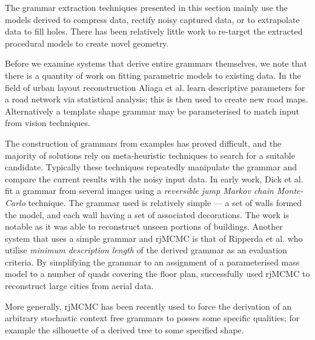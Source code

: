 



The grammar extraction techniques presented in this section mainly use the models derived to compress data, rectify noisy captured data, or to extrapolate data to fill holes. There has been relatively little work to re-target the extracted procedural models to create novel geometry.

Before we examine systems that derive entire grammars themselves, we note that there is a quantity of work on fitting parametric models to existing data. In the field of urban layout reconstruction Aliaga et al.\cite{Aliaga08} learn descriptive parameters for a road network via statistical analysis; this is then used to create new road maps. Alternatively a template shape grammar may be parameterised to match input from vision techniques\cite{Mathias11}.


The construction of grammars from examples has proved difficult, and the majority of solutions rely on meta-heuristic techniques to search for a suitable candidate. Typically these techniques repeatedly manipulate the grammar and compare the current results with the noisy input data. In early work, Dick et al.\cite{Dick04} fit a grammar from several images using a \emph{reversible jump Markov chain Monte-Carlo} technique. The grammar used is relatively simple --- a set of walls formed the model, and each wall having a set of associated decorations. The work is notable as it was able to reconstruct unseen portions of buildings. Another system that uses a simple grammar and rjMCMC is that of Ripperda et al.\cite{Ripperda08,Ripperda09} who utilise \emph{minimum description length} of the derived grammar as an evaluation criteria. By simplifying the grammar to an assignment of a parameterised mass model to a number of quads covering the floor plan, \cite{Lafarge10} successfully used rjMCMC to reconstruct large cities from aerial data.

More generally, rjMCMC has been recently used to force the derivation of an arbitrary stochastic context free grammars to posses some specific qualities\cite{Talton11}; for example the silhouette of a derived tree to some specified shape.

